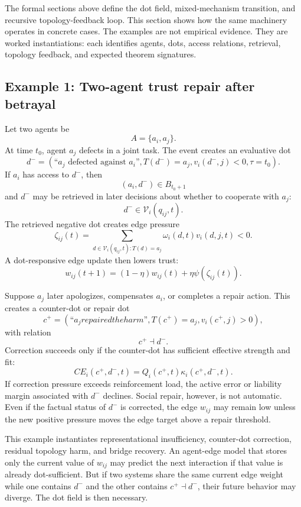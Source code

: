 \documentclass[11pt]{article}
\theoremstyle{remark}
\begin{document}
The formal sections above define the dot field, mixed-mechanism transition, and recursive topology-feedback loop. This section shows how the same machinery operates in concrete cases. The examples are not empirical evidence. They are worked instantiations: each identifies agents, dots, access relations, retrieval, topology feedback, and expected theorem signatures.

\subsection{Example 1: Two-agent trust repair after betrayal}\label{example-two-agent-trust-repair}

Let two agents be
\[
A=\{a_i,a_j\}.
\]
At time $t_0$, agent $a_j$ defects in a joint task. The event creates an evaluative dot
\[
d^-=(\text{``}a_j \text{ defected against } a_i\text{''},T(d^-)=a_j,v_i(d^-,j)<0,\tau=t_0).
\]
If $a_i$ has access to $d^-$, then
\[
(a_i,d^-)\in B_{t_0+1}
\]
and $d^-$ may be retrieved in later decisions about whether to cooperate with $a_j$:
\[
d^-\in \mathcal V_i(q_{ij},t).
\]
The retrieved negative dot creates edge pressure
\[
\zeta_{ij}(t)=\sum_{d\in \mathcal V_i(q_{ij},t):T(d)=a_j}\omega_i(d,t)v_i(d,j,t)<0.
\]
A dot-responsive edge update then lowers trust:
\[
w_{ij}(t+1)=(1-\eta)w_{ij}(t)+\eta\psi(\zeta_{ij}(t)).
\]

Suppose $a_j$ later apologizes, compensates $a_i$, or completes a repair action. This creates a counter-dot or repair dot
\[
c^+=(\text{``}a_j repaired the harm\text{''},T(c^+)=a_j,v_i(c^+,j)>0),
\]
with relation
\[
c^+\dashv d^-.
\]
Correction succeeds only if the counter-dot has sufficient effective strength and fit:
\[
CE_i(c^+,d^-,t)=Q_i(c^+,t)\kappa_i(c^+,d^-,t).
\]
If correction pressure exceeds reinforcement load, the active error or liability margin associated with $d^-$ declines. Social repair, however, is not automatic. Even if the factual status of $d^-$ is corrected, the edge $w_{ij}$ may remain low unless the new positive pressure moves the edge target above a repair threshold.

This example instantiates representational insufficiency, counter-dot correction, residual topology harm, and bridge recovery. An agent-edge model that stores only the current value of $w_{ij}$ may predict the next interaction if that value is already dot-sufficient. But if two systems share the same current edge weight while one contains $d^-$ and the other contains $c^+\dashv d^-$, their future behavior may diverge. The dot field is then necessary.
\end{document}
